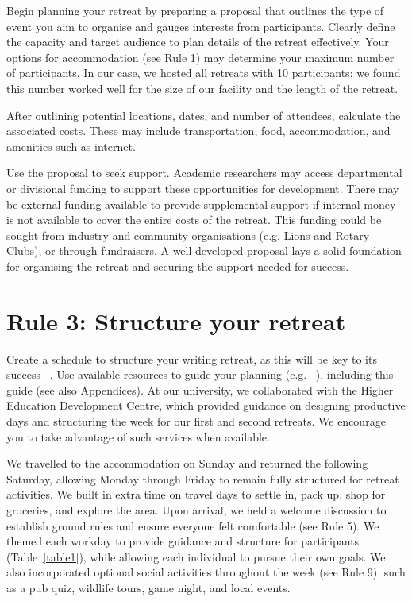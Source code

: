\documentclass[10pt,letterpaper]{article}
\begin{document}
Begin planning your retreat by preparing a proposal that outlines the type of event you aim to organise and gauges interests from participants. Clearly define the capacity and target audience to plan details of the retreat effectively. Your options for accommodation (see Rule 1) may determine your maximum number of participants. In our case, we hosted all retreats with 10 participants; we found this number worked well for the size of our facility and the length of the retreat.

After outlining potential locations, dates, and number of attendees, calculate the associated costs. These may include transportation, food, accommodation, and amenities such as internet.

Use the proposal to seek support. Academic researchers may access departmental or divisional funding to support these opportunities for development. There may be external funding available to provide supplemental support if internal money is not available to cover the entire costs of the retreat. This funding could be sought from industry and community organisations (e.g. Lions and Rotary Clubs), or through fundraisers. A well-developed proposal lays a solid foundation for organising the retreat and securing the support needed for success.

\section*{Rule 3: Structure your retreat}

Create a schedule to structure your writing retreat, as this will be key to its success ~\cite{murray2009, tremblay2021}. Use available resources to guide your planning (e.g. ~\cite{tremblay2021}), including this guide (see also Appendices). At our university, we collaborated with the Higher Education Development Centre, which provided guidance on designing productive days and structuring the week for our first and second retreats. We encourage you to take advantage of such services when available.

We travelled to the accommodation on Sunday and returned the following Saturday, allowing Monday through Friday to remain fully structured for retreat activities. We built in extra time on travel days to settle in, pack up, shop for groceries, and explore the area. Upon arrival, we held a welcome discussion to establish ground rules and ensure everyone felt comfortable (see Rule 5). We themed each workday to provide guidance and structure for participants (Table~\ref{table1}), while allowing each individual to pursue their own goals. We also incorporated optional social activities throughout the week (see Rule 9), such as a pub quiz, wildlife tours, game night, and local events.
\end{document}
